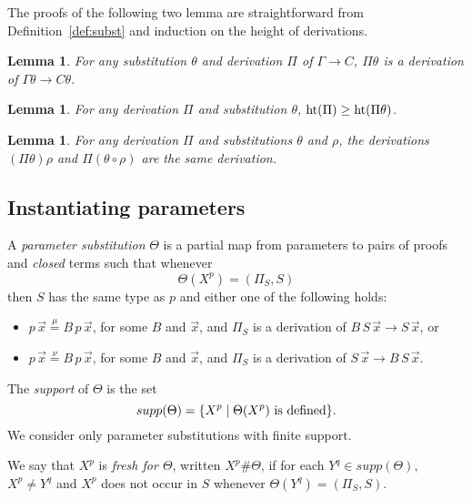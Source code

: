 \documentclass[preprint]{elsarticle}
\newcommand{\Seq}[2]{#1\longrightarrow #2}
\newcommand{\defmu}{\stackrel{\mu}{=}}
\newcommand{\defnu}{\stackrel{\nu}{=}}
\newcommand{\measure}[1]{{\rm ht}(#1)}
\newtheorem{lemma}[thm]{Lemma}
\begin{document}
The proofs of the following two lemma are straightforward from Definition~\ref{def:subst}
and induction on the height of derivations.
\begin{lemma}
  \label{lm:subst}
  For any substitution $\theta$ and derivation $\Pi$ of
  $\Seq{\Gamma}{C}$, $\Pi\theta$ is a derivation of
  $\Seq{\Gamma\theta}{C\theta}$.
\end{lemma}


\begin{lemma}
  \label{lm:subst-height}
  For any derivation $\Pi$ and substitution $\theta$, $\measure{\Pi}
  \geq \measure{\Pi\theta}$.
\end{lemma}


\begin{lemma}
  \label{lm:subst-drv-comp}
  For any derivation $\Pi$ and substitutions $\theta$ and $\rho$, the
  derivations $(\Pi\theta)\rho$ and $\Pi(\theta \circ \rho)$ are the
  same derivation.
\end{lemma}





\subsection{Instantiating parameters}
\label{sec:unfolding}

\begin{definition}
  \label{def:param subst}
  A \emph{parameter substitution} $\Theta$ is a partial map from
  parameters to pairs of proofs and \emph{closed} terms such that  whenever
$$
\Theta(X^p) = (\Pi_S, S)
$$ 
then $S$ has the same type as $p$ and either one of the following
holds:
\begin{itemize}
\item $p\,\vec x \defmu B\,p\,\vec x$, for some $B$ and $\vec x$, and
  $\Pi_S$ is a derivation of $\Seq {B\,S\,\vec x}{S\,\vec x}$,
  or
\item $p\,\vec x \defnu B\,p\,\vec x$, for some $B$ and $\vec x$, and
  $\Pi_S$ is a derivation of $\Seq {S\,\vec x}{B\,S\,\vec x}$.
\end{itemize}
The \emph{support} of $\Theta$ is the set
$$
supp(\Theta) = \{X^p \mid \Theta(X^p) \hbox{ is defined} \}.
$$
We consider only parameter substitutions with finite support.


We say that $X^p$ is \emph{fresh for $\Theta$}, written $X^p \#
\Theta$, if for each $Y^q \in supp(\Theta)$, $X^p \not = Y^q$ and
$X^p$ does not occur in $S$ whenever $\Theta(Y^q) = (\Pi_S,S)$.

\end{definition}
\end{document}
